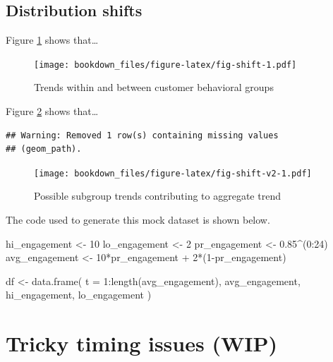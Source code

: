 \documentclass[
]{krantz}
\makeatletter
\newenvironment{Shaded}{\begin{snugshade}}{\end{snugshade}}
\newcommand{\AttributeTok}[1]{\textcolor[rgb]{0.61,0.61,0.61}{#1}}
\newcommand{\DecValTok}[1]{\textcolor[rgb]{0.06,0.06,0.06}{#1}}
\newcommand{\FloatTok}[1]{\textcolor[rgb]{0.06,0.06,0.06}{#1}}
\newcommand{\FunctionTok}[1]{\textcolor[rgb]{0,0,0}{#1}}
\newcommand{\NormalTok}[1]{#1}
\newcommand{\OtherTok}[1]{\textcolor[rgb]{0.37,0.37,0.37}{#1}}
\newcommand{\SpecialCharTok}[1]{\textcolor[rgb]{0,0,0}{#1}}
\newenvironment{kframe}{%
\medskip{}
\setlength{\fboxsep}{.8em}
 \def\at@end@of@kframe{}%
 \ifinner\ifhmode%
  \def\at@end@of@kframe{\end{minipage}}%
  \begin{minipage}{\columnwidth}%
 \fi\fi%
 \def\FrameCommand##1{\hskip\@totalleftmargin \hskip-\fboxsep
 \colorbox{shadecolor}{##1}\hskip-\fboxsep
     \hskip-\linewidth \hskip-\@totalleftmargin \hskip\columnwidth}%
 \MakeFramed {\advance\hsize-\width
   \@totalleftmargin\z@ \linewidth\hsize
   \@setminipage}}%
 {\par\unskip\endMakeFramed%
 \at@end@of@kframe}
\renewenvironment{Shaded}{\begin{kframe}}{\end{kframe}}
\makeatother
\begin{document}
\hypertarget{distribution-shifts}{%
\subsection{Distribution shifts}\label{distribution-shifts}}

Figure \ref{fig:fig-shift} shows that\ldots{}

\begin{figure}
\centering
\texttt{[image: bookdown\_files/figure-latex/fig-shift-1.pdf]}
\caption{\label{fig:fig-shift}Trends within and between customer behavioral groups}
\end{figure}

Figure \ref{fig:fig-shift-v2} shows that\ldots{}

\begin{verbatim}
## Warning: Removed 1 row(s) containing missing values
## (geom_path).
\end{verbatim}

\begin{figure}
\centering
\texttt{[image: bookdown\_files/figure-latex/fig-shift-v2-1.pdf]}
\caption{\label{fig:fig-shift-v2}Possible subgroup trends contributing to aggregate trend}
\end{figure}

The code used to generate this mock dataset is shown below.

\begin{Shaded}
\begin{Highlighting}[]
\NormalTok{hi\_engagement }\OtherTok{\textless{}{-}} \DecValTok{10}
\NormalTok{lo\_engagement }\OtherTok{\textless{}{-}} \DecValTok{2}
\NormalTok{pr\_engagement }\OtherTok{\textless{}{-}} \FloatTok{0.85}\SpecialCharTok{\^{}}\NormalTok{(}\DecValTok{0}\SpecialCharTok{:}\DecValTok{24}\NormalTok{)}
\NormalTok{avg\_engagement }\OtherTok{\textless{}{-}} \DecValTok{10}\SpecialCharTok{*}\NormalTok{pr\_engagement }\SpecialCharTok{+} \DecValTok{2}\SpecialCharTok{*}\NormalTok{(}\DecValTok{1}\SpecialCharTok{{-}}\NormalTok{pr\_engagement)}

\NormalTok{df }\OtherTok{\textless{}{-}} 
  \FunctionTok{data.frame}\NormalTok{(}
    \AttributeTok{t =} \DecValTok{1}\SpecialCharTok{:}\FunctionTok{length}\NormalTok{(avg\_engagement), }
\NormalTok{    avg\_engagement, }
\NormalTok{    hi\_engagement, }
\NormalTok{    lo\_engagement}
\NormalTok{    )}
\end{Highlighting}
\end{Shaded}

\hypertarget{tricky-timing-issues-wip}{%
\section{Tricky timing issues (WIP)}\label{tricky-timing-issues-wip}}
\end{document}
